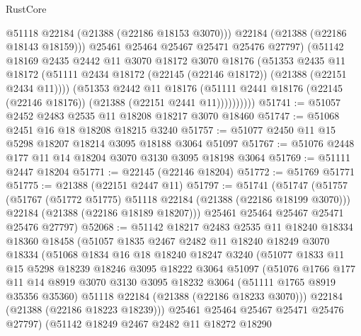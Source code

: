 \begin{lexlean}{RustCore}
\begin{coremodule}
                    @51118
                    @22184
                    (@21388 (@22186 @18153 @3070)))
                  @22184
                  (@21388 (@22186 @18143 @18159)))
                @25461
                @25464
                @25467
                @25471
                @25476
                @27797)
              (@51142
                @18169
                @2435
                @2442
                @11
                @3070
                @18172
                @3070
                @18176
                (@51353
                  @2435
                  @11
                  @18172
                  (@51111 @2434 @18172 (@22145 (@22146 @18172)) (@21388 (@22151 @2434 @11))))
                (@51353
                  @2442
                  @11
                  @18176
                  (@51111 @2441 @18176 (@22145 (@22146 @18176)) (@21388 (@22151 @2441 @11))))))))))
@51741 := @51057 @2452 @2483 @2535 @11 @18208 @18217 @3070 @18460
@51747 := @51068 @2451 @16 @18 @18208 @18215 @3240
@51757 := @51077 @2450 @11 @15 @5298 @18207 @18214 @3095 @18188 @3064 @51097
@51767 := @51076 @2448 @177 @11 @14 @18204 @3070 @3130 @3095 @18198 @3064
@51769 := @51111 @2447 @18204
@51771 := @22145 (@22146 @18204)
@51772 := @51769 @51771
@51775 := @21388 (@22151 @2447 @11)
@51797 := @51741
    (@51747
      (@51757
        (@51767 (@51772 @51775) @51118 @22184 (@21388 (@22186 @18199 @3070)))
        @22184
        (@21388 (@22186 @18189 @18207)))
      @25461
      @25464
      @25467
      @25471
      @25476
      @27797)
@52068 := @51142
    @18217
    @2483
    @2535
    @11
    @18240
    @18334
    @18360
    @18458
    (@51057
      @1835
      @2467
      @2482
      @11
      @18240
      @18249
      @3070
      @18334
      (@51068
        @1834
        @16
        @18
        @18240
        @18247
        @3240
        (@51077
          @1833
          @11
          @15
          @5298
          @18239
          @18246
          @3095
          @18222
          @3064
          @51097
          (@51076
            @1766
            @177
            @11
            @14
            @8919
            @3070
            @3130
            @3095
            @18232
            @3064
            (@51111 @1765 @8919 @35356 @35360)
            @51118
            @22184
            (@21388 (@22186 @18233 @3070)))
          @22184
          (@21388 (@22186 @18223 @18239)))
        @25461
        @25464
        @25467
        @25471
        @25476
        @27797)
      (@51142
        @18249
        @2467
        @2482
        @11
        @18272
        @18290

\end{coremodule}
\end{lexlean}
